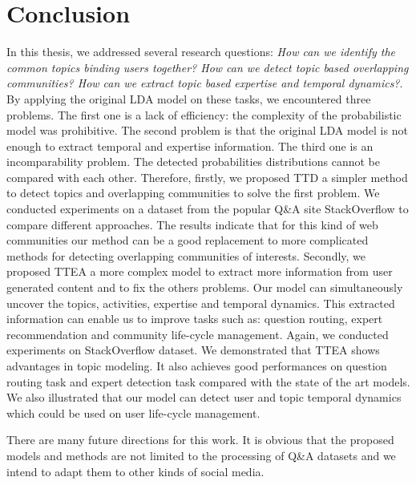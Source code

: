 \chapter{Conclusion}
\doublespacing
\label{chap:intro}
\minitoc



In this thesis, we addressed several research questions: \textit{How can we identify the common topics binding users together? How can we detect topic based overlapping communities? How can we extract topic based expertise and temporal dynamics?}. By applying the original  LDA model on these tasks, we encountered three problems. The first one is a lack of efficiency: the complexity of the probabilistic model was prohibitive. The second problem is that the original LDA model is not enough to extract temporal and expertise information. The third one is an incomparability problem. The detected probabilities distributions cannot be compared with each other. 
Therefore, firstly, we proposed TTD a simpler method to detect topics and overlapping communities to solve the first problem. We conducted experiments on a dataset from the popular Q\&A site StackOverflow to compare different approaches. The results indicate that for this kind of web communities our method can be a good replacement to more complicated methods for detecting overlapping communities of interests.
Secondly, we proposed TTEA a more complex model to extract more information from user generated content and to fix the others problems. Our model can simultaneously uncover the topics, activities, expertise and temporal dynamics. This extracted information can enable us to improve tasks such as: question routing, expert recommendation and community life-cycle management. Again, we conducted experiments on StackOverflow dataset. We demonstrated that TTEA shows advantages in topic modeling. It also achieves good performances on question routing task and expert detection task compared with the state of the art models. We also illustrated that our model can detect user and topic temporal dynamics which could be used on user life-cycle management.

There are many future directions for this work. It is obvious that the proposed models and methods are not limited to the processing of Q\&A datasets and we intend to adapt them to other kinds of social media.